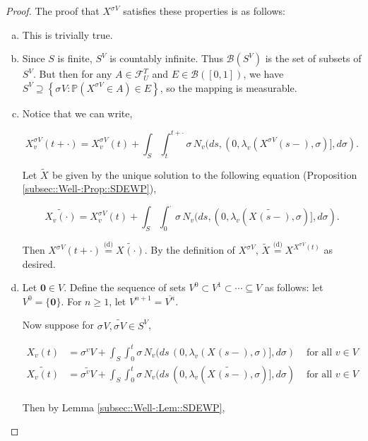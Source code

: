 \documentclass[12pt]{article}
\newcommand{\mb}{\mathbb}
\newcommand{\mc}{\mathcal}
\newcommand{\ms}{\mathscr}
\newcommand{\ov}{\overline}
\newcommand{\te}{\text}
\newcommand{\ind}{\hspace{24pt}}
\newcommand{\pr}{\mb{P}}							%
\newcommand{\deq}{\overset{\text{(d)}}{=}}			%
\renewcommand{\root}{\mathbf{0}}				%
\renewcommand{\v}{v}							%
\renewcommand{\U}{U}							%
\newcommand{\cl}{\ov}							%
\renewcommand{\S}{S}							%
\newcommand{\s}{\sigma}							%
\newcommand{\sv}[1]{\s^{#1}}					%
\newcommand{\T}{T}								%
\renewcommand{\t}{t}							%
\newcommand{\poiss}[1]{N_{#1}}						%
\newcommand{\pup}[1]{^{#1}}							%
\newcommand{\V}{V}									%
\renewcommand{\tt}{s}								%
\newcommand{\numb}{n}								%
\newcommand{\XState}[1]{\S^{#1}}				%
\newcommand{\rxvt}[2]{X_{#1}{(#2)}}					%
\newcommand{\rxvtn}[3]{X_{#1}^{#3}(#2)}				%
\newcommand{\rxvts}[2]{X_{#1}{#2}}					%
\newcommand{\rxvtsn}[3]{X_{#1}^{#3}{#2}}			%
\newcommand{\rate}[1]{\lambda_{#1}}					%
\newcommand{\F}[2]{\mc{F}_{#1}^{#2}}				%
\newcommand{\alt}{\widetilde}						%
\begin{document}
\begin{proof}
The proof that \(\rxvtsn{}{}{\sv{}{\V}}\) satisfies these properties is as follows:

\begin{enumerate}[(a)]
\item This is trivially true.

\item Since \(\S\) is finite, \(\S^\V\) is countably infinite. Thus \(\ms{B}(\S^\V)\) is the set of subsets of \(\S^\V\). But then for any \(A \in \F{\U}{\T}\) and \(E \in \ms{B}([0,1])\), we have \(\S^\V \supseteq \left\{\sv{}{\V}: \pr\left(\rxvtsn{}{}{\sv{}{\V}} \in A\right) \in E\right\}\), so the mapping is measurable.

\item Notice that we can write,

\[\rxvtn{\v}{\t+\cdot}{\sv{}{\V}} = \rxvtn{\v}{\t}{\sv{}{\V}} + \int_\S\int_\t^{\t+\cdot} \s\,\poiss{\v}(d\tt,(0,\rate{\v}(\rxvtn{}{\tt-}{\sv{}{\V}},\s)],d\s).\]

Let \(\alt{\rxvts{}{}}\) be given by the unique solution to the following equation (Proposition \ref{subsec::Well-:Prop::SDEWP}),

\[\alt{\rxvt{\v}{\cdot}} = \rxvtn{\v}{\t}{\sv{}{\V}} + \int_\S \int_0^\cdot \s\,\poiss{\v}(d\tt,(0,\rate{\v}(\alt{\rxvt{}{\tt-}},\s)],d\s).\]

Then \(\rxvtn{}{\t+\cdot}{\sv{}{\V}} \deq \alt{\rxvt{}{\cdot}}\). By the definition of \(\rxvtsn{}{}{\sv{}{\V}}\), \(\alt{\rxvts{}{}} \deq \rxvtsn{}{}{\rxvtn{}{\t}{\sv{}{\V}}}\) as desired.

\item Let \(\root \in \V\). Define the sequence of sets \(\V\pup{0}\subset \V\pup{1}\subset \cdots \subseteq \V\) as follows: let \(\V\pup{0} = \{\root\}\). For \(\numb \geq 1\), let \(\V\pup{\numb+1} = \cl{\V\pup{\numb}}\).

\ind Now suppose for \(\sv{}{\V},\alt{\sv{}{\V}}\in \S^\V\),

\begin{align*}
\rxvt{\v}{\t} &= \sv{\v}{\V} + \int_\S\int_0^\t \s\,\poiss{\v}(d\tt\,(0,\rate{\v}(\rxvt{}{\tt-},\s)],d\s)&\te{ for all } \v \in \V\\
\alt{\rxvt{\v}{\t}} &= \alt{\sv{\v}{\V}} + \int_\S\int_0^\t \s\,\poiss{\v}(d\tt\,(0,\rate{\v}(\alt{\rxvt{}{\tt-}},\s)],d\s)&\te{ for all } \v \in \V\\
\end{align*}

Then by Lemma \ref{subsec::Well-:Lem::SDEWP},


\end{enumerate}
\end{proof}
\end{document}
